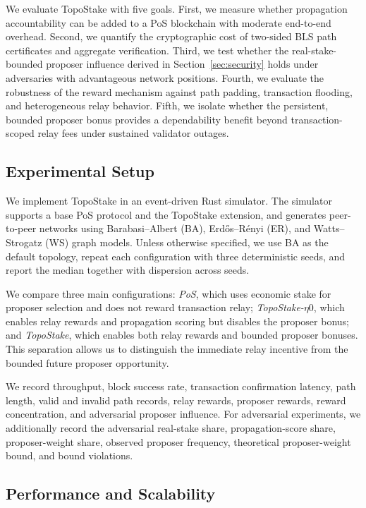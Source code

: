 \documentclass[lettersize,journal]{IEEEtran}
\begin{document}
We evaluate TopoStake with five goals. First, we measure whether propagation accountability can be added to a PoS blockchain with moderate end-to-end overhead. Second, we quantify the cryptographic cost of two-sided BLS path certificates and aggregate verification. Third, we test whether the real-stake-bounded proposer influence derived in Section~\ref{sec:security} holds under adversaries with advantageous network positions. Fourth, we evaluate the robustness of the reward mechanism against path padding, transaction flooding, and heterogeneous relay behavior. Fifth, we isolate whether the persistent, bounded proposer bonus provides a dependability benefit beyond transaction-scoped relay fees under sustained validator outages.

\subsection{Experimental Setup}
\label{subsec:eval_setup}

We implement TopoStake in an event-driven Rust simulator. The simulator supports a base PoS protocol and the TopoStake extension, and generates peer-to-peer networks using Barabasi--Albert (BA), Erdős--Rényi (ER), and Watts--Strogatz (WS) graph models. Unless otherwise specified, we use BA as the default topology, repeat each configuration with three deterministic seeds, and report the median together with dispersion across seeds.

We compare three main configurations: \emph{PoS}, which uses economic stake for proposer selection and does not reward transaction relay; \emph{TopoStake-$\eta0$}, which enables relay rewards and propagation scoring but disables the proposer bonus; and \emph{TopoStake}, which enables both relay rewards and bounded proposer bonuses. This separation allows us to distinguish the immediate relay incentive from the bounded future proposer opportunity.

We record throughput, block success rate, transaction confirmation latency, path length, valid and invalid path records, relay rewards, proposer rewards, reward concentration, and adversarial proposer influence. For adversarial experiments, we additionally record the adversarial real-stake share, propagation-score share, proposer-weight share, observed proposer frequency, theoretical proposer-weight bound, and bound violations.

\subsection{Performance and Scalability}
\label{subsec:eval_performance}
\end{document}

